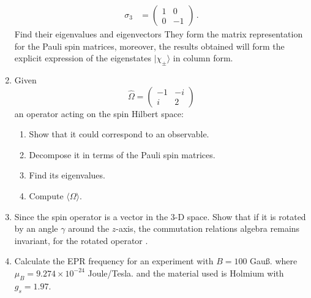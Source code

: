 \begin{enumerate}
\begin{align*}
	\sigma_3  &=
	\begin{pmatrix}
	1&0\\
	0&-1
	\end{pmatrix} \,.
	\end{align*}
	Find their eigenvalues and eigenvectors
	They form the matrix representation for the Pauli spin matrices, moreover, the results obtained will form the explicit expression of the eigenstates $ | \chi_\pm\rangle$ in column form. 
	\item Given 
	\[ \hat \Omega = \begin{pmatrix}
	-1& -i\\ i&2
	\end{pmatrix} \]
	an operator acting on the spin Hilbert space:
	\begin{enumerate}
		\item  Show that it could correspond to an observable.
		\item Decompose it in terms of the Pauli spin matrices.
		\item Find its eigenvalues.
		\item Compute $\langle \Omega \rangle $.
	\end{enumerate}
	\item Since the spin operator is a vector in the 3-D space. Show that if it is rotated by an angle $ \gamma$ around the $z$-axis, the commutation relations algebra remains invariant, for the rotated operator .
	\item Calculate the EPR frequency for an experiment with $B = 100$ Gau\ss{}. where $ \mu_B= 9.274 \times 10^ {-24}$ Joule/Tesla. and the material used is Holmium with  $g_s =1.97$. 
\end{enumerate}